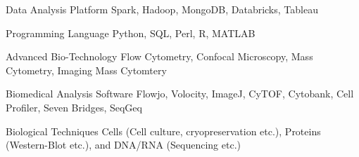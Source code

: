 


\begin{cvskills}


\cvskill
{Data Analysis Platform} %
{Spark, Hadoop, MongoDB, Databricks, Tableau} %


\cvskill
{Programming Language} %
{Python, SQL, Perl, R, MATLAB} %


\cvskill
{Advanced Bio-Technology} %
{Flow Cytometry, Confocal Microscopy, Mass Cytometry, Imaging Mass Cytomtery} %


\cvskill
{Biomedical Analysis Software} %
{Flowjo, Volocity, ImageJ, CyTOF, Cytobank, Cell Profiler, Seven
	Bridges, SeqGeq} %


\cvskill
{Biological Techniques} %
{Cells (Cell culture, cryopreservation etc.), Proteins (Western-Blot etc.), and DNA/RNA (Sequencing etc.)} %

\end{cvskills}